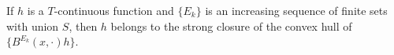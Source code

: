 If $h$ is a $T$-continuous function and $\{E_k\}$ is an increasing sequence of finite sets with union $S$, then $h$ belongs to the strong closure of the convex hull of $\{B^{E_k}(x,\cdot)h\}$.
